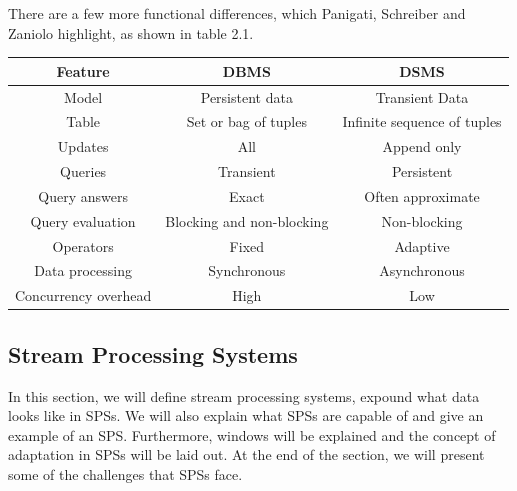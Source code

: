         \quad There are a few more functional differences, which Panigati, Schreiber and Zaniolo highlight, as shown in table 2.1.

        \begin{table}[h]
            \centering
            \label{tab:dbms-dsms}
            \begin{tabular}{|c|c|c|} \hline
                \textbf{Feature} & \textbf{DBMS} & \textbf{DSMS} \\ \hline
                Model & Persistent data & Transient Data \\ \hline
                Table & Set or bag of tuples & Infinite sequence of tuples \\ \hline
                Updates & All & Append only \\ \hline
                Queries & Transient & Persistent \\ \hline
                Query answers & Exact & Often approximate \\ \hline
                Query evaluation & Blocking and non-blocking & Non-blocking \\ \hline
                Operators & Fixed & Adaptive \\ \hline
                Data processing & Synchronous & Asynchronous \\ \hline
                Concurrency overhead  & High & Low \\ \hline
            \end{tabular}
        \end{table}

        \subsection{Stream Processing Systems}
        \label{sub:sps}

        In this section, we will define stream processing systems, expound what data looks like in SPSs. We will also explain what SPSs
        are capable of and give an example of an SPS. Furthermore, windows will be explained and the concept of adaptation in SPSs will be laid out.
        At the end of the section, we will present some of the challenges that SPSs face.

